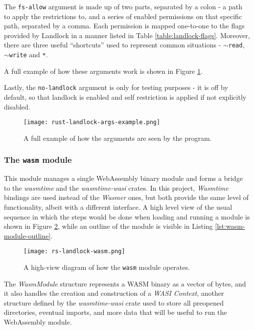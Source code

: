 The \texttt{fs-allow} argument is made up of two parts, separated by a colon - a path to apply the restrictions to,
and a series of enabled permissions on that specific path, separated by a comma.
Each permission is mapped one-to-one to the flags provided by Landlock in a manner listed in Table \ref{table:landlock-flags}.
Moreover, there are three useful ``shortcuts'' used to represent common situations - \texttt{$\sim$read}, \texttt{$\sim$write} and \texttt{*}.

A full example of how these arguments work is shown in Figure \ref{fig:args-example}.

Lastly, the \texttt{no-landlock} argument is only for testing purposes - it is off by default, so that
landlock is enabled and self restriction is applied if not explicitly disabled.

\begin{figure}[h]
  \centering
  \texttt{[image: rust-landlock-args-example.png]}
  \caption{A full example of how the arguments are seen by the program.}
  \label{fig:args-example}
\end{figure}

\subsubsection{The \texttt{wasm} module}

This module manages a single WebAssembly binary module and forms a bridge to the \textit{wasmtime} and the \textit{wasmtime-wasi}
crates. In this project, \textit{Wasmtime} bindings are used instead of the \textit{Wasmer} ones, but both provide the
same level of functionality, albeit with a different interface. A high level view of the usual sequence in which the steps would be done
when loading and running a module is shown in Figure \ref{fig:wasm-module}, while an outline of the module is visible
in Listing \ref{lst:wasm-module-outline}.

\begin{figure}[h]
  \centering
  \texttt{[image: rs-landlock-wasm.png]}
  \caption{A high-view diagram of how the \texttt{wasm} module operates.}
  \label{fig:wasm-module}
\end{figure}

The \textit{WasmModule} structure represents a WASM binary as a vector of bytes, and it also handles the creation
and construction of a \textit{WASI Context}, another structure defined by the \textit{wasmtime-wasi} crate used to store
all preopened directories, eventual imports, and more data that will be useful to run the WebAssembly module.

